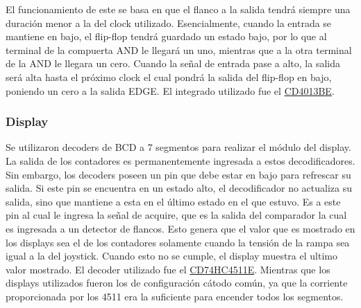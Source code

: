 El funcionamiento de este se basa en que el flanco a la salida tendrá siempre una duración menor a la del clock utilizado. Esencialmente, cuando la entrada se mantiene en bajo, el flip-flop tendrá guardado un estado bajo, por lo que al terminal de la compuerta AND le llegará un uno, mientras que a la otra terminal de la AND le llegara un cero. Cuando la señal de entrada pase a alto, la salida será alta hasta el próximo clock el cual pondrá la salida del flip-flop en bajo, poniendo un cero a la salida EDGE. El integrado utilizado fue el \href{http://www.ti.com/lit/ds/symlink/cd4013b.pdf}{CD4013BE}.


\subsubsection{Display}

Se utilizaron decoders de BCD a 7 segmentos para realizar el módulo del display. La salida de los contadores es permanentemente ingresada a estos decodificadores. Sin embargo, los decoders poseen un pin que debe estar en bajo para refrescar su salida. Si este pin se encuentra en un estado alto, el decodificador no actualiza su salida, sino que mantiene a esta en el último estado en el que estuvo. Es a este pin al cual le ingresa la señal de acquire, que es la salida del comparador la cual es ingresada a un detector de flancos. Esto genera que el valor que es mostrado en los displays sea el de los contadores solamente cuando la tensión de la rampa sea igual a la del joystick. Cuando esto no se cumple, el display muestra el ultimo valor mostrado.
El decoder utilizado fue el \href{http://www.ti.com/lit/ds/schs279d/schs279d.pdf}{CD74HC4511E}. Mientras que los displays utilizados fueron los de configuración cátodo común, ya que la corriente proporcionada por los 4511 era la suficiente para encender todos los segmentos.

